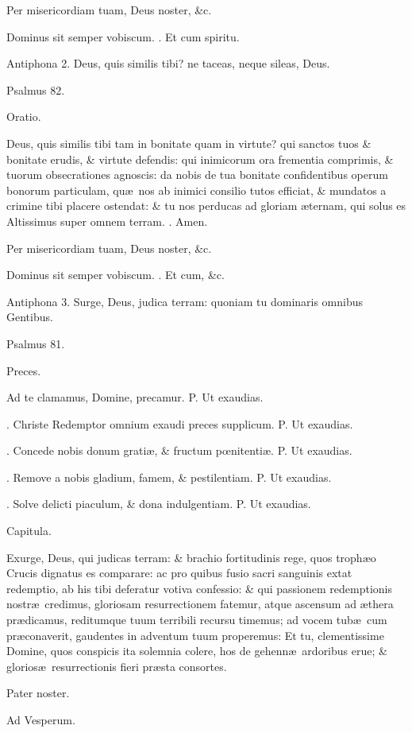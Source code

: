 \documentclass[letter,11pt]{book}
\makeatletter
\DeclareRobustCommand{\Vbar}{\vers@resp{-0.1em}{V}}
\DeclareRobustCommand{\Rbar}{\vers@resp{0pt}{R}}
\newcommand{\vers@resp@sym}{\raisebox{0.2ex}{\rotatebox[origin=c]{-20}{$\m@th\rceil$}}}
\newcommand{\vers@resp}[2]{%
  {\ooalign{\hidewidth\kern#1\vers@resp@sym\hidewidth\cr#2\cr}}%
}%
\def\P{\color{Red} P. \color{black}}
\def\V{\color{Red} \Vbar . \color{black}}
\def\R{\color{Red} \Rbar . \color{black}}
\makeatother
\begin{document}
\begin{multicols*}{2}
Per misericordiam tuam, Deus noster, \&c.

Dominus sit semper vobiscum.
\R Et cum spiritu.

Antiphona 2. Deus, quis similis tibi? ne taceas, neque sileas, Deus.

Psalmus 82.

Oratio.

Deus, quis similis tibi tam in bonitate quam in virtute? qui sanctos tuos \& bonitate erudis, \& virtute defendis: qui inimicorum ora frementia comprimis, \& tuorum obsecrationes agnoscis: da nobis de tua bonitate confidentibus operum bonorum particulam, qu\ae \ nos ab inimici consilio tutos efficiat, \& mundatos a crimine tibi placere ostendat: \& tu nos perducas ad gloriam \ae ternam, qui solus es Altissimus super omnem terram.
\R Amen.

Per misericordiam tuam, Deus noster, \&c.

Dominus sit semper vobiscum.
\R Et cum, \&c.

Antiphona 3. Surge, Deus, judica terram: quoniam tu dominaris omnibus Gentibus.

Psalmus 81.

Preces.

Ad te clamamus, Domine, precamur.
\P Ut exaudias.

\V Christe Redemptor omnium exaudi preces supplicum.
\P Ut exaudias.

\V Concede nobis donum grati\ae , \& fructum p\oe nitenti\ae .
\P Ut exaudias.

\V Remove a nobis gladium, famem, \& pestilentiam.
\P Ut exaudias.

\V Solve delicti piaculum, \& dona indulgentiam.
\P Ut exaudias.

Capitula.

Exurge, Deus, qui judicas terram: \& brachio fortitudinis rege, quos troph\ae o Crucis dignatus es comparare: ac pro quibus fusio sacri sanguinis extat redemptio, ab his tibi deferatur votiva confessio: \& qui passionem redemptionis nostr\ae \ credimus, gloriosam resurrectionem fatemur, atque ascensum ad \ae thera pr\ae dicamus, reditumque tuum terribili recursu timemus; ad vocem tub\ae \ cum pr\ae conaverit, gaudentes in adventum tuum properemus: Et tu, clementissime Domine, quos conspicis ita solemnia colere, hos de gehenn\ae \ ardoribus erue; \& glorios\ae \ resurrectionis fieri pr\ae sta consortes.

Pater noster.

Ad Vesperum.


\end{multicols*}
\end{document}
